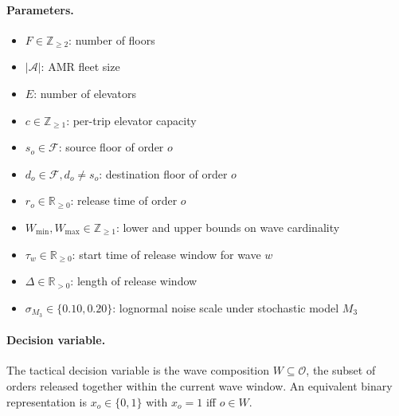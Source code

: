 \documentclass[11pt, a4paper]{article}
\begin{document}
\paragraph{Parameters.}
\begin{itemize}[noitemsep, topsep=2pt, leftmargin=1.5em]
  \item $F \in \mathbb{Z}_{\geq 2}$: number of floors
  \item $|\mathcal{A}|$: AMR fleet size
  \item $E$: number of elevators
  \item $c \in \mathbb{Z}_{\geq 1}$: per-trip elevator capacity
  \item $s_o \in \mathcal{F}$: source floor of order $o$
  \item $d_o \in \mathcal{F}, d_o \neq s_o$: destination floor of order $o$
  \item $r_o \in \mathbb{R}_{\geq 0}$: release time of order $o$
  \item $W_{\min}, W_{\max} \in \mathbb{Z}_{\geq 1}$: lower and upper bounds on wave cardinality
  \item $\tau_w \in \mathbb{R}_{\geq 0}$: start time of release window for wave $w$
  \item $\Delta \in \mathbb{R}_{> 0}$: length of release window
  \item $\sigma_{M_3} \in \{0.10, 0.20\}$: lognormal noise scale under stochastic model $M_3$
\end{itemize}

\paragraph{Decision variable.} The tactical decision variable is the wave composition $W \subseteq \mathcal{O}$, the subset of orders released together within the current wave window. An equivalent binary representation is $x_o \in \{0, 1\}$ with $x_o = 1$ iff $o \in W$.
\end{document}
